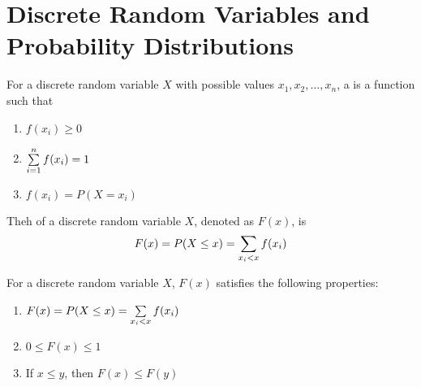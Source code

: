 \chapter{Discrete Random Variables and Probability Distributions}

    \par For a discrete random variable $X$ with possible values $x_1, x_2,
      \ldots, x_n$, a  is a function such that
    \begin{enumerate}[(1)]
      \item $f(x_i) \geq 0$
      \item $\sum\limits _{i = 1}^{n} f(x_i) = 1$
      \item $f(x_i) = P(X = x_i)$
    \end{enumerate}

  \par Theh  of a discrete random variable
    $X$, denoted as $F(x)$, is
  \begin{align*}
    F(x) = P(X \leq x) = \sum\limits _{x_i < x} f(x_i)
  \end{align*}
  \par For a discrete random variable $X$, $F(x)$ satisfies the following
    properties:
  \begin{enumerate}[(1)]
    \item $F(x) = P(X \leq x) = \sum\limits _{x_i < x} f(x_i)$
    \item $0 \leq F(x) \leq 1$
    \item If $x \leq y$, then $F(x) \leq F(y)$
  \end{enumerate}

